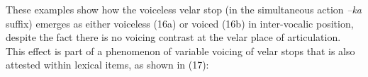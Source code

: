 





These examples show how the voiceless velar stop (in the simultaneous action \textit{–ka} suffix) emerges as either voiceless (16a) or voiced (16b) in inter-vocalic position, despite the fact there is no voicing contrast at the velar place of articulation. This effect is part of a phenomenon of variable voicing of velar stops that is also attested within lexical items, as shown in (17):








